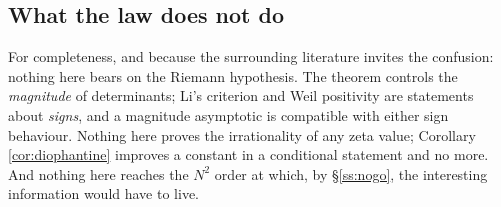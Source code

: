 \documentclass[11pt]{amsart}
\numberwithin{equation}{section}
\theoremstyle{plain}
\theoremstyle{definition}
\theoremstyle{remark}
\begin{document}
\subsection{What the law does not do}

For completeness, and because the surrounding literature invites the confusion: nothing here bears
on the Riemann hypothesis. The theorem controls the \emph{magnitude} of determinants; Li's criterion
and Weil positivity are statements about \emph{signs}, and a magnitude asymptotic is compatible with
either sign behaviour. Nothing here proves the irrationality of any zeta value; Corollary
\ref{cor:diophantine} improves a constant in a conditional statement and no more. And nothing here
reaches the $N^{2}$ order at which, by \S\ref{ss:nogo}, the interesting information would have to
live.
\end{document}

